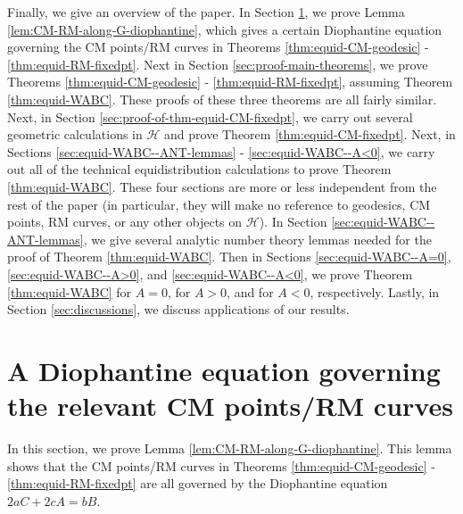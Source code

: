\documentclass[11pt,letterpaper,reqno]{amsart}
\numberwithin{equation}{section}
\numberwithin{figure}{section}
\numberwithin{table}{section}
\newcommand{\HH}{\mathcal{H}}
\begin{document}







Finally, we give an overview of the paper. 
In Section \ref{sec:dioph-eqn-governing-CM-RM}, we prove Lemma \ref{lem:CM-RM-along-G-diophantine}, which gives a certain Diophantine equation governing the CM points/RM curves in Theorems \ref{thm:equid-CM-geodesic} - \ref{thm:equid-RM-fixedpt}. Next in Section \ref{sec:proof-main-theorems}, we prove Theorems \ref{thm:equid-CM-geodesic} - \ref{thm:equid-RM-fixedpt}, assuming Theorem \ref{thm:equid-WABC}. These proofs of these three theorems are all fairly similar. Next, in Section \ref{sec:proof-of-thm-equid-CM-fixedpt}, we carry out several geometric calculations in $\HH$ and prove Theorem \ref{thm:equid-CM-fixedpt}.
Next, in Sections \ref{sec:equid-WABC--ANT-lemmas} - \ref{sec:equid-WABC--A<0}, we carry out all of the technical equidistribution calculations to prove Theorem \ref{thm:equid-WABC}. These four sections are more or less independent from the rest of the paper (in particular, they will make no reference to  geodesics, CM points, RM curves, or any other objects on $\HH$). In Section \ref{sec:equid-WABC--ANT-lemmas}, we give several analytic number theory lemmas needed for the proof of Theorem \ref{thm:equid-WABC}. 
Then in Sections \ref{sec:equid-WABC--A=0}, \ref{sec:equid-WABC--A>0}, and \ref{sec:equid-WABC--A<0}, we prove Theorem \ref{thm:equid-WABC} for $A = 0$, for $A > 0$, and for $A < 0$, respectively. 
Lastly, in Section \ref{sec:discussions}, we discuss applications of our results.


























\section{A Diophantine equation governing the relevant CM points/RM curves} \label{sec:dioph-eqn-governing-CM-RM}


In this section, we prove Lemma \ref{lem:CM-RM-along-G-diophantine}. This lemma shows that the CM points/RM curves in Theorems \ref{thm:equid-CM-geodesic} - \ref{thm:equid-RM-fixedpt} are all governed by the Diophantine equation $2aC+2cA=bB$.
\end{document}

